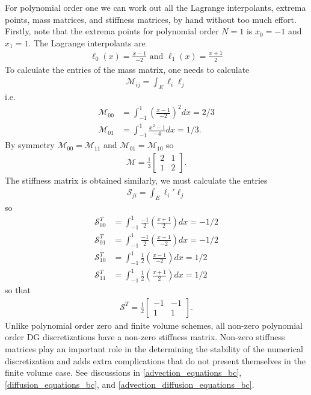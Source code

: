 \documentclass{report}
\numberwithin{equation}{section}
\begin{document}
For polynomial order one we can work out all the Lagrange interpolants, extrema points, mass matrices, and stiffness matrices, by hand without too much effort. Firstly, note that the extrema points for polynomial order $N=1$ is $x_0 = -1$ and $x_1 = 1$. The Lagrange interpolants are
\begin{align}
    \ell_0(x) = \frac{x - 1}{-2} \text{ and } \ell_1(x) = \frac{x + 1}{2}
\end{align}
To calculate the entries of the mass matrix, one needs to calculate
\begin{align}
    \mathcal{M}_{ij} = \int_{E} \ell_i \ell_j
\end{align}
i.e.
\begin{align}
    \mathcal{M}_{00} &= \int_{-1}^1 \left(\frac{x - 1}{-2}\right)^2 dx = 2/3 \\
    \mathcal{M}_{01} &= \int_{-1}^1 \frac{x^2 - 1}{-4} dx = 1/3 .
\end{align}
By symmetry $\mathcal{M}_{00} = \mathcal{M}_{11}$ and $\mathcal{M}_{01} = \mathcal{M}_{10}$ so 
\begin{align}
    \mathcal{M} = 
    \frac{1}{3}\begin{bmatrix}
    2 & 1 \\
    1 & 2
    \end{bmatrix}.
\end{align}
The stiffness matrix is obtained similarly, we must calculate the entries
\begin{align}
    \mathcal{S}_{ji} = \int_{E} \ell_i' \ell_j
\end{align}
so 
\begin{align}
    \mathcal{S}^T_{00}  &= \int_{-1}^1 \frac{-1}{2}\left(\frac{x + 1}{2} \right) dx = -1/2
    \\
    \mathcal{S}^T_{01}  &= \int_{-1}^1 \frac{-1}{2}\left(\frac{x - 1}{-2} \right) dx = -1/2
    \\
    \mathcal{S}^T_{10}  &= \int_{-1}^1 \frac{1}{2}\left(\frac{x - 1}{-2} \right) dx = 1/2
    \\
    \mathcal{S}^T_{11}  &= \int_{-1}^1 \frac{1}{2}\left(\frac{x + 1}{2} \right) dx = 1/2
\end{align}
so that
\begin{align}
    \mathcal{S}^T = \frac{1}{2} \begin{bmatrix}
        -1 & -1 \\
        1 & 1
    \end{bmatrix}.
\end{align}
Unlike polynomial order zero and finite volume schemes, all non-zero polynomial order DG discretizations have a non-zero stiffness matrix. Non-zero stiffness matrices play an important role in the determining the stability of the numerical discretization and adds extra complications that do not present themselves in the finite volume case. See discussions in \ref{advection_equations_bc}, \ref{diffusion_equations_bc}, and \ref{advection_diffusion_equations_bc}.
\end{document}
